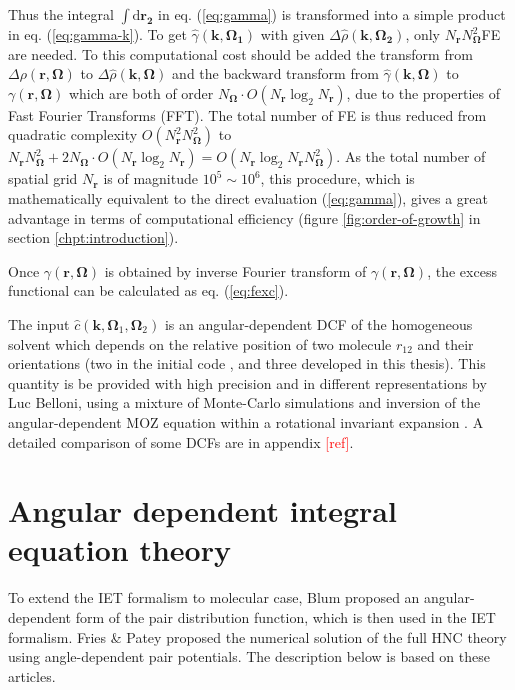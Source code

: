 Thus the integral $\int\mathrm{d}\mathbf{r_{2}}$ in eq. (\ref{eq:gamma})
is transformed into a simple product in eq. (\ref{eq:gamma-k}). To
get $\hat{\gamma}(\mathbf{k},\mathbf{\Omega_{1}})$ with given $\Delta\hat{\rho}(\mathbf{k},\mathbf{\Omega_{2}})$,
only $N_{\mathbf{r}}N_{\mathbf{\Omega}}^{2}$\acs{FE} are needed.
To this computational cost should be added the transform from $\Delta\rho(\mathbf{r},\mathbf{\Omega})$
to $\Delta\hat{\rho}(\mathbf{k},\mathbf{\Omega})$ and the backward
transform from $\hat{\gamma}(\mathbf{k},\mathbf{\Omega})$ to $\gamma(\mathbf{r},\mathbf{\Omega})$
which are both of order $N_{\mathbf{\Omega}}\cdot O(N_{\mathbf{r}}\log_{2}N_{\mathbf{r}})$,
due to the properties of Fast Fourier Transforms (\acs{FFT}). The
total number of \acs{FE} is thus reduced from quadratic complexity
$O(N_{\mathbf{r}}^{2}N_{\mathbf{\Omega}}^{2})$ to $N_{\mathbf{r}}N_{\mathbf{\Omega}}^{2}+2N_{\mathbf{\Omega}}\cdot O(N_{\mathbf{r}}\log_{2}N_{\mathbf{r}})=O(N_{\mathbf{r}}\log_{2}N_{\mathbf{r}}N_{\mathbf{\Omega}}^{2})$.
As the total number of spatial grid $N_{\mathbf{r}}$ is of magnitude
$10^{5}\sim10^{6}$, this procedure, which is mathematically equivalent
to the direct evaluation (\ref{eq:gamma}), gives a great advantage
in terms of computational efficiency (figure \ref{fig:order-of-growth}
in section \ref{chpt:introduction}).

Once $\gamma(\mathbf{r},\mathbf{\Omega})$ is obtained by inverse
Fourier transform of $\gamma(\mathbf{r},\mathbf{\Omega})$, the excess
functional can be calculated as eq. (\ref{eq:fexc}).

The input $\hat{c}(\mathbf{k},\mathbf{\Omega}_{1},\mathbf{\Omega}_{2})$
is an angular-dependent \acs{DCF} of the homogeneous solvent which
depends on the relative position of two molecule $r_{12}$ and their
orientations (two in the initial code \citep{Zhao_2011}, and three
developed in this thesis). This quantity is be provided with high
precision and in different representations by Luc Belloni, using a
mixture of Monte-Carlo simulations and inversion of the angular-dependent
\acs{MOZ} equation within a rotational invariant expansion \citep{puibasset_bridge_2012}.
A detailed comparison of some \acs{DCF}s are in appendix \textcolor{red}{{[}ref{]}}.

\section{Angular dependent integral equation theory}

To extend the \acs{IET} formalism to molecular case, Blum \citep{Blum_I,Blum_II}
proposed an angular-dependent form of the pair distribution function,
which is then used in the \acs{IET} formalism. Fries \& Patey \citep{Fries_Patey_1985}
proposed the numerical solution of the full \acs{HNC} theory using
angle-dependent pair potentials. The description below is based on
these articles.

